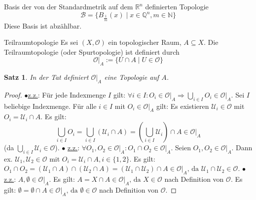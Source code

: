 \documentclass[a4paper,11pt,notitlepage]{report}
\newtheorem{theorem}{Satz}[chapter]
\newcommand{\R}{{\ensuremath{\mathbb{R}}}}
\newcommand{\N}{{\ensuremath{\mathbb{N}}}}
\newcommand{\Q}{{\ensuremath{\mathbb{Q}}}}
\newcommand{\OO}{{\ensuremath{\mathcal{O}}}}
\begin{document}
\begin{section}{Basis der von der Standardmetrik auf dem $\R^n$ definierten Topologie}
	$$\mathcal{B} = \{B_{\frac{1}{m}}(x) \mid x \in \Q^n, m \in \N\}$$
	Diese Basis ist abzählbar.
\end{section}

\begin{section}{Teilraumtopologie}
	Es sei $(X, \OO)$ ein topologischer Raum, $A \subseteq X$.
	\newline
	Die Teilraumtopologie (oder Spurtopologie) ist definiert durch
	$$\OO \big |_{A} := \{U \cap A \mid U \in \OO\} $$
	
	\begin{theorem}
		In der Tat definiert $\OO \big |_{A}$ eine Topologie auf $A$.
	\end{theorem}
	
	\begin{proof}
			$\bullet$\underline{z.z.}: Für jede Indexmenge $I$ gilt:
				$\forall i \in I \colon O_i \in \OO \big |_{A} \Rightarrow \bigcup\limits_{i \in I}{O_i} \in \OO \big |_{A}.$
			\newline
			Sei $I$ beliebige Indexmenge. Für alle $i \in I$ mit $O_i \in \OO \big |_{A}$ gilt:
			Es existieren $\mathcal{U}_i \in \OO$ mit $O_i= \mathcal{U}_i \cap A$.
			Es gilt:
			$$\bigcup\limits_{i \in I}{O_i} = \bigcup\limits_{i \in I}{(\mathcal{U}_i \cap A) } = (\bigcup\limits_{i \in I}{\mathcal{U}_i})\cap A \in \OO \big |_{A}$$ (da $\bigcup\limits_{i \in I}{\mathcal{U}_i} \in \OO$).
			\newline
			$\bullet$ \underline{z.z.}: $\forall O_1, O_2 \in \OO \big |_{A} \colon O_1 \cap O_2 \in \OO \big |_{A}.$
			\newline
			Seien $O_1, O_2 \in \OO \big |_{A}$. Dann ex. $\mathcal{U}_1, \mathcal{U}_2 \in \OO$ mit $O_i = \mathcal{U}_i \cap A, i \in \{1,2\}.$ Es gilt:
			$O_1 \cap O_2 = (\mathcal{U}_1 \cap A) \cap (\mathcal{U}_2 \cap A) = (\mathcal{U}_1 \cap \mathcal{U}_2) \cap A \in \OO \big |_{A} \text{, da } \mathcal{U}_1 \cap \mathcal{U}_2 \in \OO.$
			\newline
			$\bullet$ \underline{z.z.}: $A, \emptyset \in \OO \big |_{A}.$
			\newline
			Es gilt: $A = X \cap A \in \OO \big |_{A}\text{, da } X \in \OO$ nach Definition von $\OO$. 
			\newline
			Es gilt: $\emptyset = \emptyset \cap A \in \OO \big |_{A} \text{, da } \emptyset \in \OO$ nach Definition von $\OO$.
	\end{proof}
\end{section}
\end{document}
